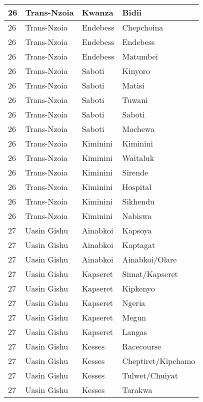\begin{table}[!ht]
\begin{tabular}{|l|l|l|l|}
        26 & Trans-Nzoia & Kwanza & Bidii \\ \hline
        26 & Trans-Nzoia & Endebess & Chepchoina \\ \hline
        26 & Trans-Nzoia & Endebess & Endebess \\ \hline
        26 & Trans-Nzoia & Endebess & Matumbei \\ \hline
        26 & Trans-Nzoia & Saboti & Kinyoro \\ \hline
        26 & Trans-Nzoia & Saboti & Matisi \\ \hline
        26 & Trans-Nzoia & Saboti & Tuwani \\ \hline
        26 & Trans-Nzoia & Saboti & Saboti \\ \hline
        26 & Trans-Nzoia & Saboti & Machewa \\ \hline
        26 & Trans-Nzoia & Kiminini & Kiminini \\ \hline
        26 & Trans-Nzoia & Kiminini & Waitaluk \\ \hline
        26 & Trans-Nzoia & Kiminini & Sirende \\ \hline
        26 & Trans-Nzoia & Kiminini & Hospital \\ \hline
        26 & Trans-Nzoia & Kiminini & Sikhendu \\ \hline
        26 & Trans-Nzoia & Kiminini & Nabiswa \\ \hline
        27 & Uasin Gishu & Ainabkoi & Kapsoya \\ \hline
        27 & Uasin Gishu & Ainabkoi & Kaptagat \\ \hline
        27 & Uasin Gishu & Ainabkoi & Ainabkoi/Olare \\ \hline
        27 & Uasin Gishu & Kapseret & Simat/Kapseret \\ \hline
        27 & Uasin Gishu & Kapseret & Kipkenyo \\ \hline
        27 & Uasin Gishu & Kapseret & Ngeria \\ \hline
        27 & Uasin Gishu & Kapseret & Megun \\ \hline
        27 & Uasin Gishu & Kapseret & Langas \\ \hline
        27 & Uasin Gishu & Kesses & Racecourse \\ \hline
        27 & Uasin Gishu & Kesses & Cheptiret/Kipchamo \\ \hline
        27 & Uasin Gishu & Kesses & Tulwet/Chuiyat \\ \hline
        27 & Uasin Gishu & Kesses & Tarakwa \\ \hline

\end{tabular}
\end{table}
